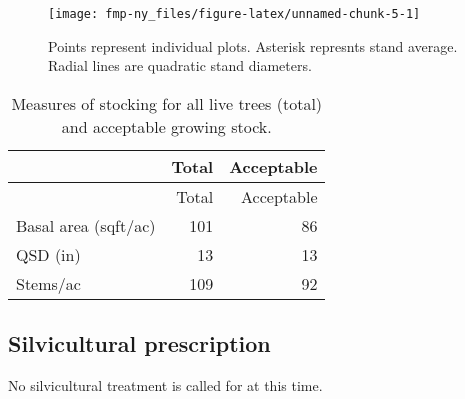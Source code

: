 \documentclass[]{tufte-handout}
\begin{document}
\begin{figure}
\texttt{[image: fmp-ny\_files/figure-latex/unnamed-chunk-5-1]} \caption[Points represent individual plots]{Points represent individual plots. Asterisk represnts stand average. Radial lines are quadratic stand diameters.}\label{fig:unnamed-chunk-5}
\end{figure}

\begin{longtable}[]{@{}lrr@{}}
\caption{Measures of stocking for all live trees (total) and acceptable
growing stock.}\tabularnewline
\toprule
& Total & Acceptable\tabularnewline
\midrule
\endfirsthead
\toprule
& Total & Acceptable\tabularnewline
\midrule
\endhead
Basal area (sqft/ac) & 101 & 86\tabularnewline
QSD (in) & 13 & 13\tabularnewline
Stems/ac & 109 & 92\tabularnewline
\bottomrule
\end{longtable}

\subsection{Silvicultural
prescription}\label{silvicultural-prescription}

No silvicultural treatment is called for at this time.

\newpage
\end{document}
